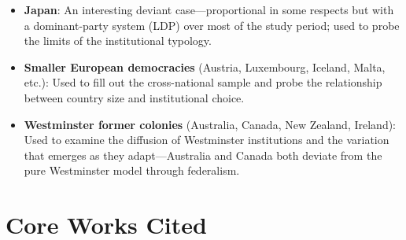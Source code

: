 \documentclass[12pt]{article}
\begin{document}
\begin{itemize}[leftmargin=*, itemsep=4pt]
    \item \textbf{Japan}: An interesting deviant case---proportional in some respects but with a dominant-party system (LDP) over most of the study period; used to probe the limits of the institutional typology.
    \item \textbf{Smaller European democracies} (Austria, Luxembourg, Iceland, Malta, etc.): Used to fill out the cross-national sample and probe the relationship between country size and institutional choice.
    \item \textbf{Westminster former colonies} (Australia, Canada, New Zealand, Ireland): Used to examine the diffusion of Westminster institutions and the variation that emerges as they adapt---Australia and Canada both deviate from the pure Westminster model through federalism.
\end{itemize}

\section{Core Works Cited}
\end{document}
